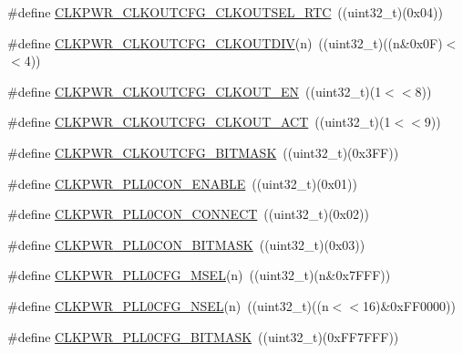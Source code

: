 \begin{DoxyCompactItemize}
\item 
\#define \hyperlink{group___c_l_k_p_w_r___private___macros_ga32299db2735461be4a1c196fd37481a0}{\-C\-L\-K\-P\-W\-R\-\_\-\-C\-L\-K\-O\-U\-T\-C\-F\-G\-\_\-\-C\-L\-K\-O\-U\-T\-S\-E\-L\-\_\-\-R\-T\-C}~((uint32\-\_\-t)(0x04))
\item 
\#define \hyperlink{group___c_l_k_p_w_r___private___macros_gafeb09b4c23f05af8a671efde1522342e}{\-C\-L\-K\-P\-W\-R\-\_\-\-C\-L\-K\-O\-U\-T\-C\-F\-G\-\_\-\-C\-L\-K\-O\-U\-T\-D\-I\-V}(n)~((uint32\-\_\-t)((n\&0x0\-F)$<$$<$4))
\item 
\#define \hyperlink{group___c_l_k_p_w_r___private___macros_gaa19d155cbb1df10796e9e37cf0ee8182}{\-C\-L\-K\-P\-W\-R\-\_\-\-C\-L\-K\-O\-U\-T\-C\-F\-G\-\_\-\-C\-L\-K\-O\-U\-T\-\_\-\-E\-N}~((uint32\-\_\-t)(1$<$$<$8))
\item 
\#define \hyperlink{group___c_l_k_p_w_r___private___macros_ga75827422d265c934f086a8da44a51e5a}{\-C\-L\-K\-P\-W\-R\-\_\-\-C\-L\-K\-O\-U\-T\-C\-F\-G\-\_\-\-C\-L\-K\-O\-U\-T\-\_\-\-A\-C\-T}~((uint32\-\_\-t)(1$<$$<$9))
\item 
\#define \hyperlink{group___c_l_k_p_w_r___private___macros_ga4773a06bb00ac608b396f9717b8ed82a}{\-C\-L\-K\-P\-W\-R\-\_\-\-C\-L\-K\-O\-U\-T\-C\-F\-G\-\_\-\-B\-I\-T\-M\-A\-S\-K}~((uint32\-\_\-t)(0x3\-F\-F))
\item 
\#define \hyperlink{group___c_l_k_p_w_r___private___macros_ga1906f68fbb1a9849dd95762b58f68daa}{\-C\-L\-K\-P\-W\-R\-\_\-\-P\-L\-L0\-C\-O\-N\-\_\-\-E\-N\-A\-B\-L\-E}~((uint32\-\_\-t)(0x01))
\item 
\#define \hyperlink{group___c_l_k_p_w_r___private___macros_ga3065f59de6fe4a98ca1d5b32388bc4aa}{\-C\-L\-K\-P\-W\-R\-\_\-\-P\-L\-L0\-C\-O\-N\-\_\-\-C\-O\-N\-N\-E\-C\-T}~((uint32\-\_\-t)(0x02))
\item 
\#define \hyperlink{group___c_l_k_p_w_r___private___macros_gab2cde6ecc24952ed9d2e618369800ea9}{\-C\-L\-K\-P\-W\-R\-\_\-\-P\-L\-L0\-C\-O\-N\-\_\-\-B\-I\-T\-M\-A\-S\-K}~((uint32\-\_\-t)(0x03))
\item 
\#define \hyperlink{group___c_l_k_p_w_r___private___macros_ga14bf9de58726a6b37af38cc6f73a09e3}{\-C\-L\-K\-P\-W\-R\-\_\-\-P\-L\-L0\-C\-F\-G\-\_\-\-M\-S\-E\-L}(n)~((uint32\-\_\-t)(n\&0x7\-F\-F\-F))
\item 
\#define \hyperlink{group___c_l_k_p_w_r___private___macros_ga3e7c277eb3c68f20bf9ad5a994624cae}{\-C\-L\-K\-P\-W\-R\-\_\-\-P\-L\-L0\-C\-F\-G\-\_\-\-N\-S\-E\-L}(n)~((uint32\-\_\-t)((n$<$$<$16)\&0x\-F\-F0000))
\item 
\#define \hyperlink{group___c_l_k_p_w_r___private___macros_ga71d49ff2380fd0026cd20c2039558ddc}{\-C\-L\-K\-P\-W\-R\-\_\-\-P\-L\-L0\-C\-F\-G\-\_\-\-B\-I\-T\-M\-A\-S\-K}~((uint32\-\_\-t)(0x\-F\-F7\-F\-F\-F))

\end{DoxyCompactItemize}
